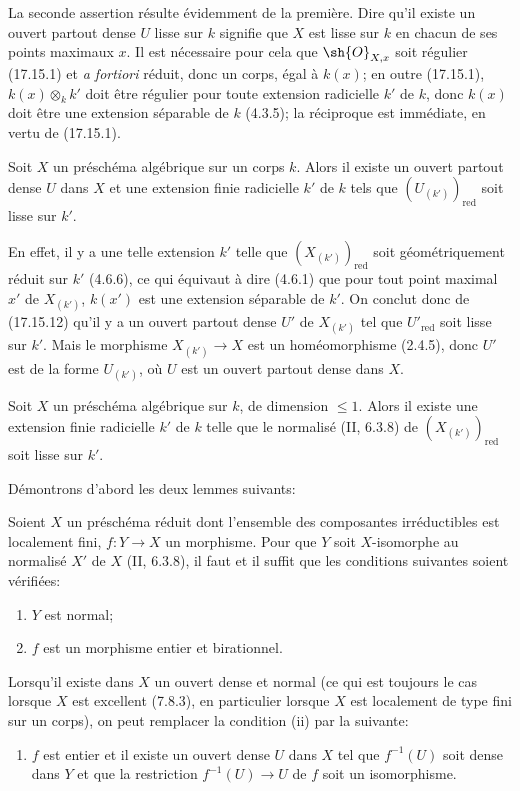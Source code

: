 La seconde assertion résulte évidemment de la première. Dire qu'il existe un ouvert partout dense $U$ lisse sur $k$ signifie que $X$ est lisse sur $k$ en chacun de ses points maximaux $x$. Il est nécessaire pour cela que $\sh{O}_{X,x}$ soit régulier (17.15.1) et \emph{a fortiori} réduit, donc un corps, égal à $k(x)$; en outre (17.15.1), $k(x)\otimes_k k'$ doit être régulier pour toute extension radicielle $k'$ de $k$, donc $k(x)$ doit être une extension séparable de $k$ (4.3.5); la réciproque est immédiate, en vertu de (17.15.1).

\begin{corollary}[17.15.13]
\label{IV.17.15.13}
Soit $X$ un préschéma algébrique sur un corps $k$. Alors il existe un ouvert partout dense $U$ dans $X$ et une extension finie radicielle $k'$ de $k$ tels que $(U_{(k')})_{\mathrm{red}}$ soit lisse sur $k'$.
\end{corollary}

En effet, il y a une telle extension $k'$ telle que $(X_{(k')})_{\mathrm{red}}$ soit géométriquement réduit sur $k'$ (4.6.6), ce qui équivaut à dire (4.6.1) que pour tout point maximal $x'$ de $X_{(k')}$, $k(x')$ est une extension séparable de $k'$. On conclut donc de (17.15.12) qu'il y a un ouvert partout dense $U'$ de $X_{(k')}$ tel que $U'_{\mathrm{red}}$ soit lisse sur $k'$. Mais le morphisme $X_{(k')}\to X$ est un homéomorphisme (2.4.5), donc $U'$ est de la forme $U_{(k')}$, où $U$ est un ouvert partout dense dans $X$.

\begin{proposition}[17.15.14]
\label{IV.17.15.14}
Soit $X$ un préschéma algébrique sur $k$, de dimension $\leq1$. Alors il existe une extension finie radicielle $k'$ de $k$ telle que le normalisé (II, 6.3.8) de $(X_{(k')})_{\mathrm{red}}$ soit lisse sur $k'$.
\end{proposition}

Démontrons d'abord les deux lemmes suivants:

\begin{lemma}[17.15.14.1]
\label{IV.17.15.14.1}
Soient $X$ un préschéma réduit dont l'ensemble des composantes irréductibles est localement fini, $f:Y\to X$ un morphisme. Pour que $Y$ soit $X$-isomorphe au normalisé $X'$ de $X$ (II, 6.3.8), il faut et il suffit que les conditions suivantes soient vérifiées:
\begin{enumerate}
  \item[(i)] $Y$ est normal;
  \item[(ii)] $f$ est un morphisme entier et birationnel.
\end{enumerate}
Lorsqu'il existe dans $X$ un ouvert dense et normal (ce qui est toujours le cas lorsque $X$ est excellent (7.8.3), en particulier lorsque $X$ est localement de type fini sur un corps), on peut remplacer la condition (ii) par la suivante:
\begin{enumerate}
  \item[(ii bis)] $f$ est entier et il existe un ouvert dense $U$ dans $X$ tel que $f^{-1}(U)$ soit dense dans $Y$ et que la restriction $f^{-1}(U)\to U$ de $f$ soit un isomorphisme.
\end{enumerate}
\end{lemma}

